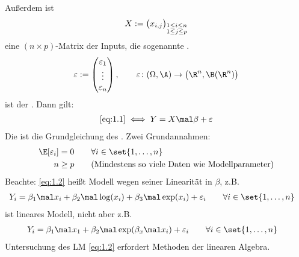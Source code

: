 Außerdem ist
\begin{align*}
	X:=\big(x_{i,j}\big)_{\begin{subarray}{c}
		1\leq i\leq n\\
		1\leq j\leq p
	\end{subarray}}
\end{align*}
eine $(n\times p)$-Matrix der Inputs, die sogenannte .
\begin{align*}
	\varepsilon:=\begin{pmatrix}
		\varepsilon_1\\
		\vdots\\
		\varepsilon_n
	\end{pmatrix},\qquad
	\varepsilon\colon(\Omega,\A)\to\big(\R^n,\B(\R^n)\big)
\end{align*}
ist der .
Dann gilt:
\begin{align}\label{eq:1.2}%
	\eqref{eq:1.1}
	\iff 
	Y=X\mal\beta+\varepsilon
\end{align}
Die ist die Grundgleichung des .
Zwei Grundannahmen:
\begin{align}\label{eq:1.3}
	\E[\varepsilon_i]&=0\qquad\forall i\in\set{1,\ldots,n}\\
	n&\geq p\qquad\text{(Mindestens so viele Daten wie Modellparameter)}
	\label{eq:1.4}
\end{align}
Beachte: \eqref{eq:1.2} heißt  Modell wegen seiner Linearität in $\beta$, z.B. 
\begin{align*}
	Y_i&=\beta_1\mal x_i+\beta_2\mal\log(x_i)+\beta_3\mal\exp(x_i)+\varepsilon_i
	\qquad\forall i\in\set{1,\ldots,n}
\end{align*}
ist lineares Modell, nicht aber z.B.
\begin{align*}
	Y_i&=\beta_1\mal x_1+\beta_2\mal\exp(\beta_x\mal x_i)+\varepsilon_i
	\qquad\forall i\in\set{1,\ldots,n}
\end{align*}
Untersuchung des LM \eqref{eq:1.2} erfordert Methoden der linearen Algebra.
